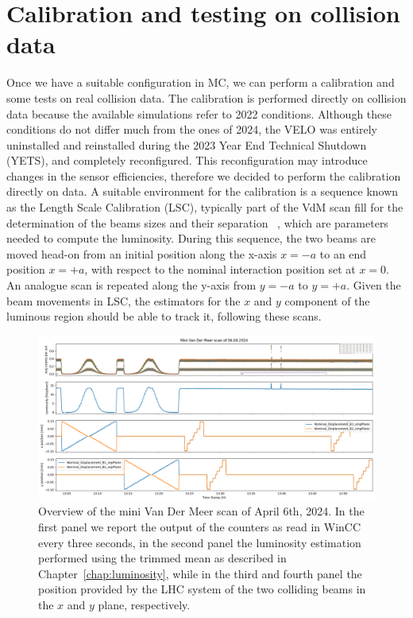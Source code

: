 \section{Calibration and testing on collision data}\label{sec:beamline_calib}
Once we have a suitable configuration in MC, we can perform a calibration and some tests on real collision data. The calibration is performed directly on collision data because the available simulations refer to 2022 conditions. Although these conditions do not differ much from the ones of 2024, the VELO was entirely uninstalled and reinstalled during the 2023 Year End Technical Shutdown (YETS), and completely reconfigured. This reconfiguration may introduce changes in the sensor efficiencies, therefore we decided to perform the calibration directly on data. A suitable environment for the calibration is a sequence known as the Length Scale Calibration (LSC), typically part of the VdM scan fill for the determination of the beams sizes and their separation ~\cite{Balagura_2021}, which are parameters needed to compute the luminosity. During this sequence, the two beams are moved head-on from an initial position along the x-axis $x=-a$ to an end position $x=+a$, with respect to the nominal interaction position set at $x=0$. An analogue scan is repeated along the y-axis from $y=-a$ to $y=+a$. 
Given the beam movements in LSC, the estimators for the $x$ and $y$ component of the luminous region should be able to track it, following these scans.

\begin{figure}
    \centering
    \includegraphics[width=\textwidth]{figures/lumi_with_counters.png}
    \caption{Overview of the mini Van Der Meer scan of April 6th, 2024. In the first panel we report the output of the counters as read in WinCC every three seconds, in the second panel the luminosity estimation performed using the trimmed mean as described in Chapter~\ref{chap:luminosity}, while in the third and fourth panel the position provided by the LHC system of the two colliding beams in the $x$ and $y$ plane, respectively.}
    \label{fig:mini-vdm}
\end{figure}

